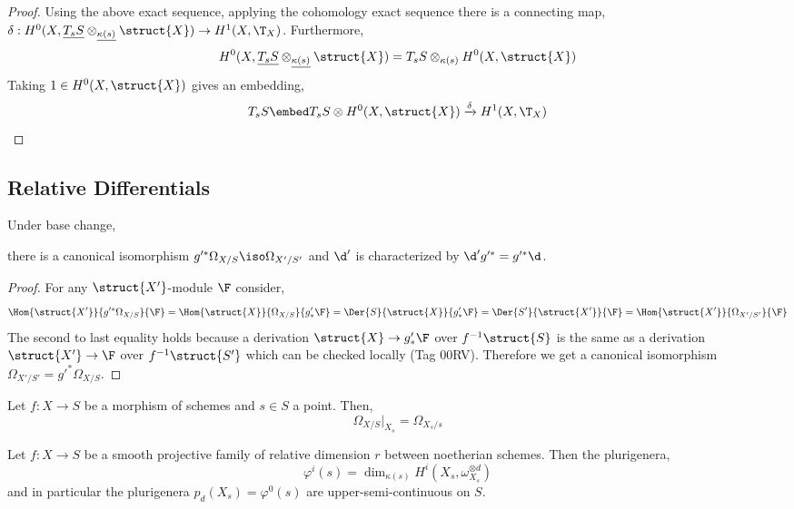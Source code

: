 \documentclass[12pt]{article}
\begin{document}
\begin{proof}
Using the above exact sequence, applying the cohomology exact sequence there is a connecting map, $\delta : H^0(X, \underline{T_s S} \otimes_{\underline{\kappa(s)}} \struct{X}) \to H^1(X, \T_{X})$. Furthermore,
\[ H^0(X, \underline{T_s S} \otimes_{\underline{\kappa(s)}} \struct{X}) = T_s S \otimes_{\kappa(s)} H^0(X, \struct{X}) \]
Taking $1 \in H^0(X, \struct{X})$ gives an embedding,
\[ T_s S \embed T_s S \otimes H^0(X, \struct{X}) \xrightarrow{\delta} H^1(X, \T_{X}) \]
\end{proof}

\subsection{Relative Differentials}

\begin{prop}
Under base change,
\begin{center}
\end{center}
there is a canonical isomorphism $g'^* \Omega_{X/S} \iso \Omega_{X'/S'}$ and $\d'$ is characterized by $\d' g'^* = g'^* \d$.
\end{prop}

\begin{proof}
For any $\struct{X'}$-module $\F$ consider,
\[ \Hom{\struct{X'}}{g'^* \Omega_{X/S}}{\F} = \Hom{\struct{X}}{\Omega_{X/S}}{g'_* \F} = \Der{S}{\struct{X}}{g'_* \F} =  \Der{S'}{\struct{X'}}{\F} = \Hom{\struct{X'}}{\Omega_{X'/S'}}{\F} \]
The second to last equality holds because a derivation $\struct{X} \to g'_* \F$ over $f^{-1} \struct{S}$ is the same as a derivation $\struct{X'} \to \F$ over $f^{-1} \struct{S'}$ which can be checked locally (Tag 00RV). Therefore we get a canonical isomorphism $\Omega_{X'/S'} = g'^* \Omega_{X/S}$.
\end{proof}

\begin{prop}
Let $f : X \to S$ be a morphism of schemes and $s \in S$ a point. Then,
\[ \Omega_{X/S} |_{X_s} = \Omega_{X_s / s} \]
\end{prop}

\begin{prop}
Let $f : X \to S$ be a smooth projective family of relative dimension $r$ between noetherian schemes. Then the plurigenera,
\[ \varphi^i(s) = \dim_{\kappa(s)} H^i(X_s, \omega_{X_s}^{\otimes d}) \]
and in particular the plurigenera $p_d(X_s) = \varphi^0(s)$
are upper-semi-continuous on $S$. 
\end{prop}
\end{document}
